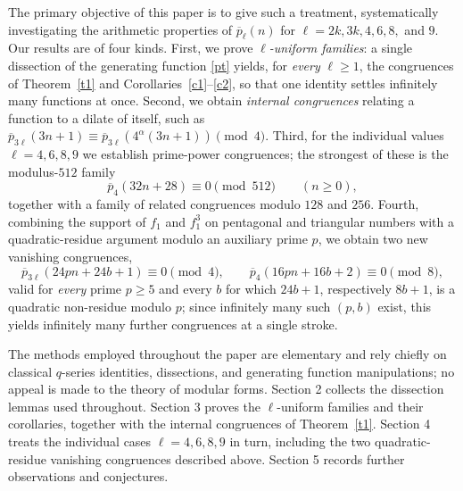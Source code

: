 \documentclass[10pt,a4paper]{amsart}
\numberwithin{equation}{section}
\begin{document}
	The primary objective of this paper is to give such a treatment, systematically investigating the arithmetic properties of $\overline{p}_{\ell}(n)$ for $\ell=2k,3k,4,6,8,$ and $9$. Our results are of four kinds. First, we prove \emph{$\ell$-uniform families}: a single dissection of the generating function \eqref{pt} yields, for \emph{every} $\ell\ge1$, the congruences of Theorem~\ref{t1} and Corollaries~\ref{c1}--\ref{c2}, so that one identity settles infinitely many functions at once. Second, we obtain \emph{internal congruences} relating a function to a dilate of itself, such as $\overline{p}_{3\ell}(3n+1)\equiv\overline{p}_{3\ell}\!\left(4^\alpha(3n+1)\right)\pmod 4$. Third, for the individual values $\ell=4,6,8,9$ we establish prime-power congruences; the strongest of these is the modulus-$512$ family
	\[
	\overline{p}_{4}(32n+28)\equiv0\pmod{512}\qquad(n\ge0),
	\]
	together with a family of related congruences modulo $128$ and $256$. Fourth, combining the support of $f_1$ and $f_1^3$ on pentagonal and triangular numbers with a quadratic-residue argument modulo an auxiliary prime $p$, we obtain two new vanishing congruences,
	\[
	\overline{p}_{3\ell}(24pn+24b+1)\equiv0\pmod4,\qquad
	\overline{p}_{4}(16pn+16b+2)\equiv0\pmod8,
	\]
	valid for \emph{every} prime $p\ge5$ and every $b$ for which $24b+1$, respectively $8b+1$, is a quadratic non-residue modulo $p$; since infinitely many such $(p,b)$ exist, this yields infinitely many further congruences at a single stroke.
	
	The methods employed throughout the paper are elementary and rely chiefly on classical $q$-series identities, dissections, and generating function manipulations; no appeal is made to the theory of modular forms. Section 2 collects the dissection lemmas used throughout. Section 3 proves the $\ell$-uniform families and their corollaries, together with the internal congruences of Theorem~\ref{t1}. Section 4 treats the individual cases $\ell=4,6,8,9$ in turn, including the two quadratic-residue vanishing congruences described above. Section 5 records further observations and conjectures.
	
\end{document}
